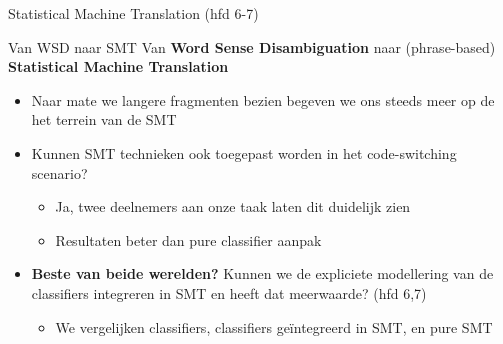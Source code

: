\documentclass[8pt]{beamer}
\begin{document}
\begin{frame}{Statistical Machine Translation (hfd 6-7)}

    \begin{block}{Van WSD naar SMT}
        Van \textbf{Word Sense Disambiguation} naar (phrase-based) \textbf{Statistical Machine Translation}
        \begin{itemize}
            \item Naar mate we langere fragmenten bezien begeven we ons steeds meer op de het terrein van de SMT
            \item Kunnen SMT technieken ook toegepast worden in het code-switching scenario?
            \begin{itemize}
                \item Ja, twee deelnemers aan onze taak laten dit duidelijk zien
                \item Resultaten beter dan pure classifier aanpak
            \end{itemize}
            \item \textbf{Beste van beide werelden?} Kunnen we de expliciete modellering van de classifiers integreren in SMT en heeft dat meerwaarde? (hfd 6,7)
           \begin{itemize}
               \item We vergelijken classifiers, classifiers geïntegreerd in SMT, en pure SMT
           \end{itemize}

        \end{itemize}
    \end{block}
\end{frame}
\end{document}
